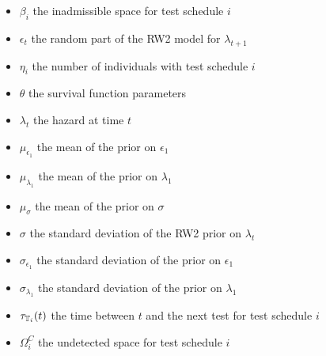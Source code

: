 \documentclass[thesis.tex]{subfiles}
\begin{document}
\begin{itemize}
    \item $\beta_i$ the inadmissible space for test schedule $i$
    \item $\epsilon_t$ the random part of the RW2 model for $\lambda_{t+1}$
    \item $\eta_i$ the number of individuals with test schedule $i$
    \item $\theta$ the survival function parameters
    \item $\lambda_t$ the hazard at time $t$
    \item $\mu_{\epsilon_1}$ the mean of the prior on $\epsilon_1$
    \item $\mu_{\lambda_1}$ the mean of the prior on $\lambda_1$
    \item $\mu_\sigma$ the mean of the prior on $\sigma$
    \item $\sigma$ the standard deviation of the RW2 prior on $\lambda_t$
    \item $\sigma_{\epsilon_1}$ the standard deviation of the prior on $\epsilon_1$
    \item $\sigma_{\lambda_1}$ the standard deviation of the prior on $\lambda_1$
    \item $\tau_{\mathbb{T}_i}(t)$ the time between $t$ and the next test for test schedule $i$
    \item $\Omega_i^C$ the undetected space for test schedule $i$
\end{itemize}
\end{document}
